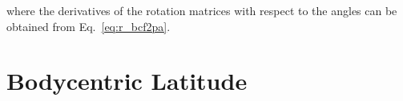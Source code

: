 \documentclass[]{article}
\newcommand{\vb}[1]{\bm{#1}} %
\begin{document}
where the derivatives of the rotation matrices with respect to the angles can be obtained from Eq.~\eqref{eq:r_bcf2pa}.


\section{Bodycentric Latitude}
\end{document}
